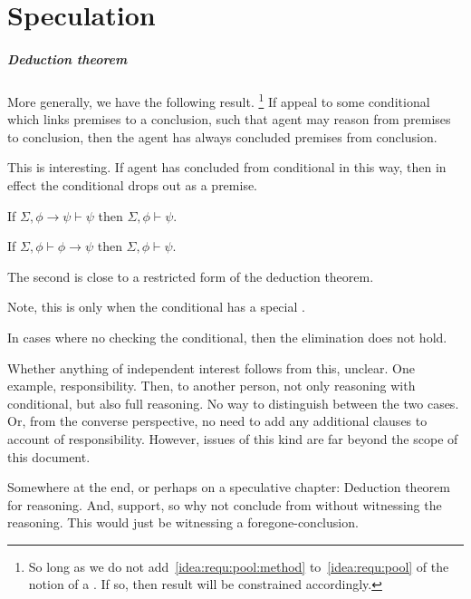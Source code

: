 \chapter{Speculation}
\label{cha:speculation}

\paragraph{Deduction theorem}

\begin{note}
  More generally, we have the following result.%
  \footnote{
    So long as we do not add~\autoref{idea:requ:pool:method} to~\autoref{idea:requ:pool} of the notion of a \requ{}.
    If so, then result will be constrained accordingly.
  }
  If appeal to some conditional which links premises to a conclusion, such that agent may reason from premises to conclusion, then the agent has always concluded premises from conclusion.

  This is interesting.
  If agent has concluded from conditional in this way, then in effect the conditional drops out as a premise.

  If \(\Sigma, \phi \rightarrow \psi \vdash \psi\) then \(\Sigma, \phi \vdash \psi\).

  If \(\Sigma, \phi \vdash \phi \rightarrow \psi\) then \(\Sigma, \phi \vdash \psi\).

  The second is close to a restricted form of the deduction theorem.

  Note, this is only when the conditional has a special \requ{}.

  In cases where no checking the conditional, then the elimination does not hold.

  Whether anything of independent interest follows from this, unclear.
  One example, responsibility.
  Then, to another person, not only reasoning with conditional, but also full reasoning.
  No way to distinguish between the two cases.
  Or, from the converse perspective, no need to add any additional clauses to account of responsibility.
  However, issues of this kind are far beyond the scope of this document.
\end{note}

\begin{note}
  Somewhere at the end, or perhaps on a speculative chapter:
  Deduction theorem for reasoning.
  And, support, so why not conclude from without witnessing the reasoning.
  This would just be witnessing a foregone-conclusion.
\end{note}

